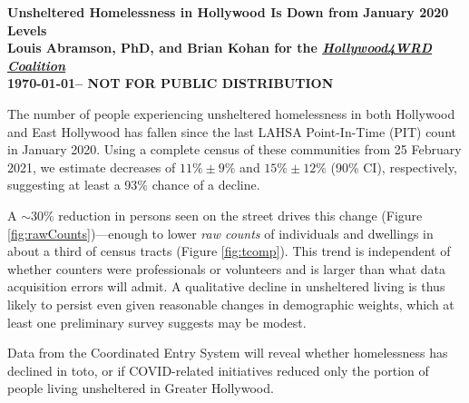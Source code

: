 \documentclass[11pt]{article}
\def\bfr{\bf\color{red}}
\def\resp{respectively}
\begin{document}

\begin{center}
	\Large\bf Unsheltered Homelessness in Hollywood Is Down from January 2020 Levels\\
	\vspace{1ex}
	{\normalsize\rm Louis Abramson, PhD, and Brian Kohan 
	for the \href{http://www.hollywood4wrd.live}{\it Hollywood4WRD Coalition} \\ \today -- {\bfr NOT FOR PUBLIC DISTRIBUTION}}


\end{center}

 The number of people experiencing unsheltered homelessness in both Hollywood 
and East Hollywood has fallen since the last LAHSA Point-In-Time (PIT) count in January 2020. %
Using a complete census of these communities from 25 February 2021, we estimate decreases of 
$11\%\pm9\%$ and $15\%\pm12\%$ (90\% CI), \resp, suggesting at least a 93\% chance of a decline.

A $\sim$30\% reduction in persons seen on the street drives this change (Figure \ref{fig:rawCounts})---enough 
to lower {\it raw counts} of individuals and dwellings in about a third of census tracts (Figure \ref{fig:tcomp}). 
This trend is independent of whether counters were professionals or volunteers and is larger than what data acquisition 
errors will admit. A qualitative decline in unsheltered living is thus likely to persist even given reasonable 
changes in demographic weights, which at least one preliminary survey suggests may be modest. 

Data from the Coordinated Entry System will reveal whether homelessness has declined in toto, or if
COVID-related initiatives reduced only the portion of people living unsheltered in Greater Hollywood.
\end{document}
